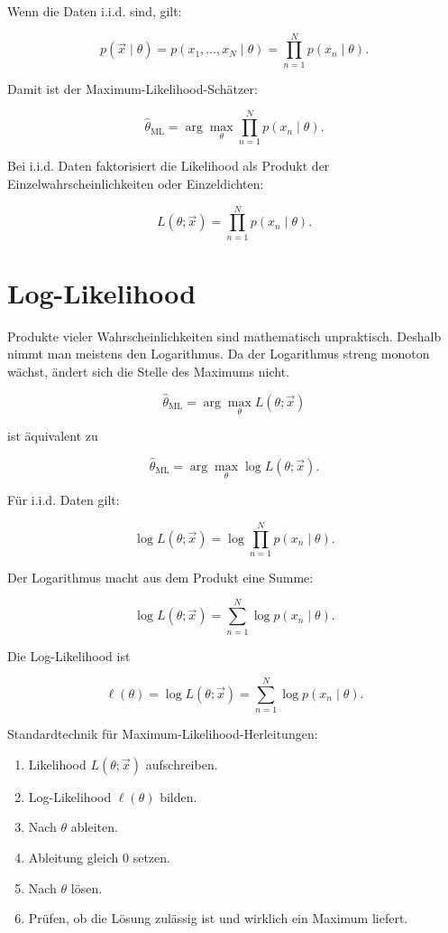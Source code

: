 Wenn die Daten i.i.d. sind, gilt:

\[
    p(\vec{x} \mid \theta)
    =
    p(x_1,\dots,x_N \mid \theta)
    =
    \prod_{n=1}^{N}
    p(x_n \mid \theta).
\]

Damit ist der Maximum-Likelihood-Schätzer:

\[
    \hat{\theta}_{\mathrm{ML}}
    =
    \arg\max_{\theta}
    \prod_{n=1}^{N}
    p(x_n \mid \theta).
\]

\begin{conceptbox}
Bei i.i.d. Daten faktorisiert die Likelihood als Produkt der Einzelwahrscheinlichkeiten oder Einzeldichten:

\[
    L(\theta;\vec{x})
    =
    \prod_{n=1}^{N}
    p(x_n \mid \theta).
\]
\end{conceptbox}

\section{Log-Likelihood}

Produkte vieler Wahrscheinlichkeiten sind mathematisch unpraktisch.
Deshalb nimmt man meistens den Logarithmus.
Da der Logarithmus streng monoton wächst, ändert sich die Stelle des Maximums nicht.

\[
    \hat{\theta}_{\mathrm{ML}}
    =
    \arg\max_{\theta}
    L(\theta;\vec{x})
\]

ist äquivalent zu

\[
    \hat{\theta}_{\mathrm{ML}}
    =
    \arg\max_{\theta}
    \log L(\theta;\vec{x}).
\]

Für i.i.d. Daten gilt:

\[
    \log L(\theta;\vec{x})
    =
    \log
    \prod_{n=1}^{N}
    p(x_n \mid \theta).
\]

Der Logarithmus macht aus dem Produkt eine Summe:

\[
    \log L(\theta;\vec{x})
    =
    \sum_{n=1}^{N}
    \log p(x_n \mid \theta).
\]

\begin{definitionbox}
Die Log-Likelihood ist

\[
    \ell(\theta)
    =
    \log L(\theta;\vec{x})
    =
    \sum_{n=1}^{N}
    \log p(x_n \mid \theta).
\]
\end{definitionbox}

\begin{examtipbox}
Standardtechnik für Maximum-Likelihood-Herleitungen:

\begin{enumerate}
    \item Likelihood \(L(\theta;\vec{x})\) aufschreiben.
    \item Log-Likelihood \(\ell(\theta)\) bilden.
    \item Nach \(\theta\) ableiten.
    \item Ableitung gleich \(0\) setzen.
    \item Nach \(\theta\) lösen.
    \item Prüfen, ob die Lösung zulässig ist und wirklich ein Maximum liefert.
\end{enumerate}
\end{examtipbox}

